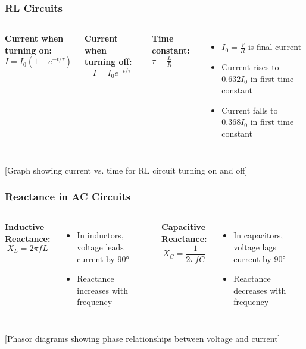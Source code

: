 \documentclass{beamer}
\begin{document}
\begin{frame}
\frametitle{RL Circuits}
\begin{columns}
\textbf{Current when turning on:}
\begin{equation}
I = I_0(1 - e^{-t/\tau})
\end{equation}

\textbf{Current when turning off:}
\begin{equation}
I = I_0e^{-t/\tau}
\end{equation}

\textbf{Time constant:} $\tau = \frac{L}{R}$
\begin{itemize}
    \item $I_0 = \frac{V}{R}$ is final current
    \item Current rises to $0.632I_0$ in first time constant
    \item Current falls to $0.368I_0$ in first time constant
\end{itemize}
\end{columns}
\alert{[Graph showing current vs. time for RL circuit turning on and off]}
\end{frame}

\begin{frame}
\frametitle{Reactance in AC Circuits}
\begin{columns}
\textbf{Inductive Reactance:}
\begin{equation}
X_L = 2\pi fL
\end{equation}
\begin{itemize}
    \item In inductors, voltage leads current by 90°
    \item Reactance increases with frequency
\end{itemize}
\textbf{Capacitive Reactance:}
\begin{equation}
X_C = \frac{1}{2\pi fC}
\end{equation}
\begin{itemize}
    \item In capacitors, voltage lags current by 90°
    \item Reactance decreases with frequency
\end{itemize}
\end{columns}
\alert{[Phasor diagrams showing phase relationships between voltage and current]}
\end{frame}
\end{document}
